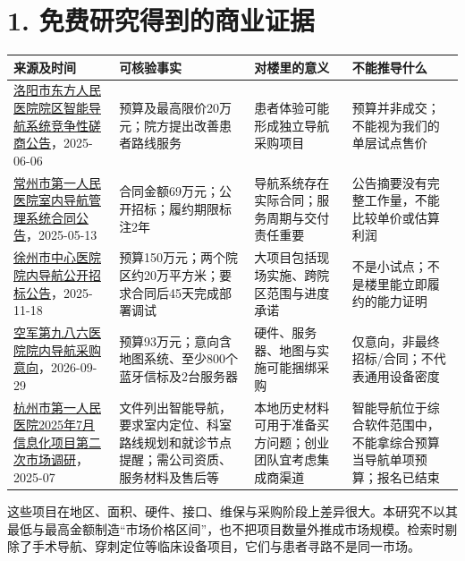 \documentclass[UTF8,10pt,fontset=fandol]{ctexart}
\begin{document}
\section*{1. 免费研究得到的商业证据}
\begingroup\small\begin{longtable}{>{\raggedright\arraybackslash}p{}>{\raggedright\arraybackslash}p{}>{\raggedright\arraybackslash}p{}>{\raggedright\arraybackslash}p{}}
\textbf{来源及时间} & \textbf{可核验事实} & \textbf{对楼里的意义} & \textbf{不能推导什么}\\\hline\endhead
\href{https://www.lydfyy.com/doc/11/2506/9433.html}{洛阳市东方人民医院院区智能导航系统竞争性磋商公告}，2025-06-06 & 预算及最高限价20万元；院方提出改善患者路线服务 & 患者体验可能形成独立导航采购项目 & 预算并非成交；不能视为我们的单层试点售价\\\hline
\href{https://zfcg.changzhou.gov.cn/html/ns/zfjzcg_htgg/581399523463842.html}{常州市第一人民医院室内导航管理系统合同公告}，2025-05-13 & 合同金额69万元；公开招标；履约期限标注2年 & 导航系统存在实际合同；服务周期与交付责任重要 & 公告摘要没有完整工作量，不能比较单价或估算利润\\\hline
\href{https://ggzy.zwb.xz.gov.cn/jyxx/003004/003004002/20251118/9b9bf5f8-19c3-4dbc-b8bc-814296ec9c38.html}{徐州市中心医院院内导航公开招标公告}，2025-11-18 & 预算150万元；两个院区约20万平方米；要求合同后45天完成部署调试 & 大项目包括现场实施、跨院区范围与进度承诺 & 不是小试点；不是楼里能立即履约的能力证明\\\hline
\href{https://www.fmmu.edu.cn/tongzhi/info/1276/43140.htm}{空军第九八六医院院内导航采购意向}，2026-09-29 & 预算93万元；意向含地图系统、至少800个蓝牙信标及2台服务器 & 硬件、服务器、地图与实施可能捆绑采购 & 仅意向，非最终招标/合同；不代表通用设备密度\\\hline
\href{https://www.hz-hospital.com/upload_public/20250711/202507110857549453.pdf}{杭州市第一人民医院2025年7月信息化项目第二次市场调研}，2025-07 & 文件列出智能导航，要求室内定位、科室路线规划和就诊节点提醒；需公司资质、服务材料及售后等 & 本地历史材料可用于准备买方问题；创业团队宜考虑集成商渠道 & 智能导航位于综合软件范围中，不能拿综合预算当导航单项预算；报名已结束\\\hline
\end{longtable}\endgroup
这些项目在地区、面积、硬件、接口、维保与采购阶段上差异很大。本研究不以其最低与最高金额制造“市场价格区间”，也不把项目数量外推成市场规模。检索时剔除了手术导航、穿刺定位等临床设备项目，它们与患者寻路不是同一市场。\par
\end{document}
